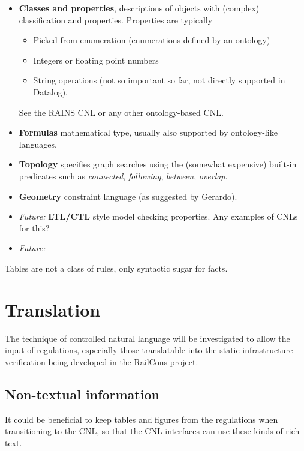 \documentclass[]{article}
\providecommand{\tightlist}{%
  \setlength{\itemsep}{0pt}\setlength{\parskip}{0pt}}
\begin{document}
\begin{itemize}
\item
  \textbf{Classes and properties}, descriptions of objects with
  (complex) classification and properties. Properties are typically

  \begin{itemize}
  \tightlist
  \item
    Picked from enumeration (enumerations defined by an ontology)
  \item
    Integers or floating point numbers
  \item
    String operations (not so important so far, not directly supported
    in Datalog).
  \end{itemize}

  See the RAINS CNL or any other ontology-based CNL.
\item
  \textbf{Formulas} mathematical type, usually also supported by
  ontology-like languages.
\item
  \textbf{Topology} specifies graph searches using the (somewhat
  expensive) built-in predicates such as \emph{connected},
  \emph{following}, \emph{between}, \emph{overlap}.
\item
  \textbf{Geometry} constraint language (as suggested by Gerardo).
\item
  \emph{Future:} \textbf{LTL/CTL} style model checking properties. Any
  examples of CNLs for this?
\item
  \emph{Future:}
\end{itemize}

Tables are not a class of rules, only syntactic sugar for facts.

\section{Translation}\label{translation}

The technique of controlled natural language will be investigated to
allow the input of regulations, especially those translatable into the
static infrastructure verification being developed in the RailCons
project.

\subsection{Non-textual information}\label{non-textual-information}

It could be beneficial to keep tables and figures from the regulations
when transitioning to the CNL, so that the CNL interfaces can use these
kinds of rich text.
\end{document}
